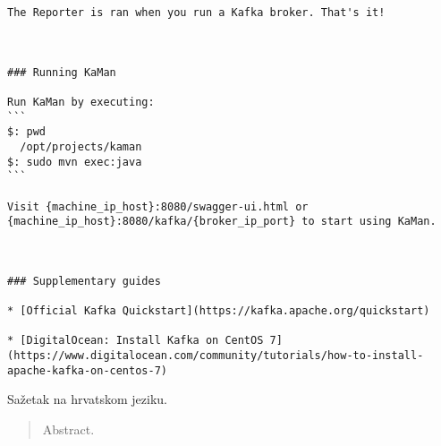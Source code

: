 \documentclass[times, utf8, diplomski, numeric]{fer}
\begin{document}
\begin{lstlisting}[breaklines]
The Reporter is ran when you run a Kafka broker. That's it!  



### Running KaMan

Run KaMan by executing:  
```
$: pwd
  /opt/projects/kaman
$: sudo mvn exec:java
```

Visit {machine_ip_host}:8080/swagger-ui.html or {machine_ip_host}:8080/kafka/{broker_ip_port} to start using KaMan.



### Supplementary guides

* [Official Kafka Quickstart](https://kafka.apache.org/quickstart)

* [DigitalOcean: Install Kafka on CentOS 7](https://www.digitalocean.com/community/tutorials/how-to-install-apache-kafka-on-centos-7)
\end{lstlisting}




\begin{sazetak}
Sažetak na hrvatskom jeziku.

\end{sazetak}

\begin{abstract}
Abstract.

\end{abstract}
\end{document}
